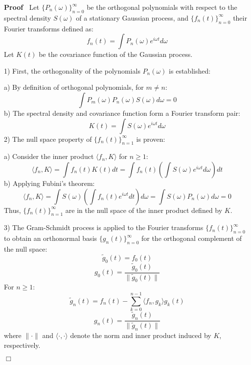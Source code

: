 \documentclass{article}
\newcommand{\cdummy}{\cdot}
\newenvironment{proof}{\noindent\textbf{Proof\ }}{\hspace*{\fill}$\Box$\medskip}
\begin{document}
\begin{proof}
  Let $\{P_n (\omega)\}_{n = 0}^{\infty}$ be the orthogonal polynomials with
  respect to the spectral density $S (\omega)$ of a stationary Gaussian
  process, and $\{f_n (t)\}_{n = 0}^{\infty}$ their Fourier transforms defined
  as:
  \begin{equation}
    f_n (t) = \int P_n (\omega) e^{i \omega t} d \omega
  \end{equation}
  Let $K (t)$ be the covariance function of the Gaussian process.
  
  1) First, the orthogonality of the polynomials $P_n (\omega)$ is
  established:
  
  a) By definition of orthogonal polynomials, for $m \neq n$:
  \begin{equation}
    \int P_m (\omega) P_n (\omega) S (\omega) d \omega = 0
  \end{equation}
  b) The spectral density and covariance function form a Fourier transform
  pair:
  \begin{equation}
    K (t) = \int S (\omega) e^{i \omega t} d \omega
  \end{equation}
  2) The null space property of $\{f_n (t)\}_{n = 1}^{\infty}$ is proven:
  
  a) Consider the inner product $\langle f_n, K \rangle$ for $n \geq 1$:
  \begin{equation}
    \langle f_n, K \rangle = \int f_n (t) K (t) dt = \int f_n (t) \left( \int
    S (\omega) e^{i \omega t} d \omega \right) dt
  \end{equation}
  b) Applying Fubini's theorem:
  \begin{equation}
    \langle f_n, K \rangle = \int S (\omega) \left( \int f_n (t) e^{i \omega
    t} dt \right) d \omega = \int S (\omega) P_n (\omega) d \omega = 0
  \end{equation}
  Thus, $\{f_n (t)\}_{n = 1}^{\infty}$ are in the null space of the inner
  product defined by $K$.
  
  3) The Gram-Schmidt process is applied to the Fourier transforms $\{f_n
  (t)\}_{n = 0}^{\infty}$ to obtain an orthonormal basis $\{g_n (t)\}_{n =
  0}^{\infty}$ for the orthogonal complement of the null space:
  \begin{equation}
    \tilde{g}_0 (t) = f_0 (t)
  \end{equation}
  \begin{equation}
    g_0 (t) = \frac{\tilde{g}_0 (t)}{\| \tilde{g}_0 (t)\|}
  \end{equation}
  For $n \geq 1$:
  \begin{equation}
    \tilde{g}_n (t) = f_n (t) - \sum_{k = 0}^{n - 1} \langle f_n, g_k \rangle
    g_k (t)
  \end{equation}
  \begin{equation}
    g_n (t) = \frac{\tilde{g}_n (t)}{\| \tilde{g}_n (t)\|}
  \end{equation}
  where $\| \cdummy \|$ and $\langle \cdummy, \cdummy \rangle$ denote the norm
  and inner product induced by $K$, respectively.
  

\end{proof}
\end{document}
